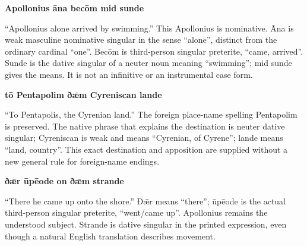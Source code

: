 \textbf{Apollonius āna becōm mid sunde}

“Apollonius alone arrived by swimming.” This Apollonius is nominative. Āna is weak masculine nominative singular in the sense “alone”, distinct from the ordinary cardinal “one”. Becōm is third-person singular preterite, “came, arrived”. Sunde is the dative singular of a neuter noun meaning “swimming”; mid sunde gives the means. It is not an infinitive or an instrumental case form.

\textbf{tō Pentapolim ðǣm Cyreniscan lande}

“To Pentapolis, the Cyrenian land.” The foreign place-name spelling Pentapolim is preserved. The native phrase that explains the destination is neuter dative singular; Cyreniscan is weak and means “Cyrenian, of Cyrene”; lande means “land, country”. This exact destination and apposition are supplied without a new general rule for foreign-name endings.

\textbf{ðǣr ūpēode on ðǣm strande}

“There he came up onto the shore.” Ðǣr means “there”; ūpēode is the actual third-person singular preterite, “went/\allowbreak{}came up”. Apollonius remains the understood subject. Strande is dative singular in the printed expression, even though a natural English translation describes movement.

